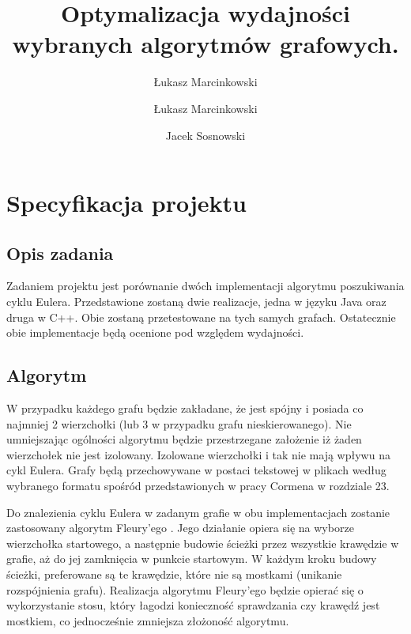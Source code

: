 \documentclass[12pt,oneside,a4paper]{article}
\begin{document}
\author{Łukasz Marcinkowski}
\author{Łukasz Marcinkowski \and Jacek Sosnowski}
\title{Optymalizacja wydajności wybranych algorytmów grafowych.}
\maketitle


\section{Specyfikacja projektu}

\subsection{Opis zadania}

Zadaniem projektu jest porównanie dwóch implementacji algorytmu poszukiwania cyklu Eulera. 
Przedstawione zostaną dwie realizacje, jedna w języku Java oraz druga w C++. 
Obie zostaną przetestowane na tych samych grafach. 
Ostatecznie obie implementacje będą ocenione pod względem wydajności.

\subsection{Algorytm}

W przypadku każdego grafu będzie zakładane, że jest spójny i posiada co najmniej 2 wierzchołki (lub 3 w przypadku grafu nieskierowanego). 
Nie umniejszając ogólności algorytmu będzie przestrzegane założenie iż żaden wierzchołek nie jest izolowany. 
Izolowane wierzchołki i tak nie mają wpływu na cykl Eulera. 
Grafy będą przechowywane w postaci tekstowej w plikach według wybranego formatu spośród przedstawionych w pracy Cormena \cite{Cormen} w rozdziale 23.

Do znalezienia cyklu Eulera w zadanym grafie w obu implementacjach zostanie zastosowany algorytm Fleury'ego \cite{Wojciechowski}. 
Jego działanie opiera się na wyborze wierzchołka startowego, a następnie budowie ścieżki przez wszystkie krawędzie w grafie, aż do jej zamknięcia w punkcie startowym. 
W każdym kroku budowy ścieżki, preferowane są te krawędzie, które nie są mostkami (unikanie rozspójnienia grafu).
Realizacja algorytmu Fleury'ego będzie opierać się o wykorzystanie stosu, który łagodzi konieczność sprawdzania czy krawędź jest mostkiem, co jednocześnie zmniejsza złożoność algorytmu.
\end{document}
